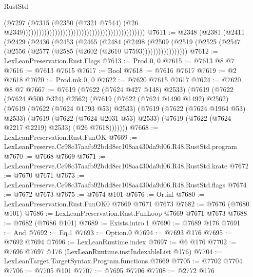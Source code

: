 \begin{lexlean}{RustStd}
\begin{coremodule}
                                                                                        (@7297
                                                                                          (@7315
                                                                                            (@2350
                                                                                              (@7321
                                                                                                @7544)
                                                                                              (@26
                                                                                                @2349))))))))))))))))))))))))))))))))))))))))))))))
@7611 := @2348
    (@2381
      (@2411
        (@2429
          (@2436
            (@2453
              (@2465
                (@2484
                  (@2498
                    (@2509
                      (@2519 (@2525 (@2547 (@2556 (@2577 (@2585 (@2602 (@2610 @7593)))))))))))))))))
@7612 := LexLeanPreservation.Rust.Flags
@7613 := Prod.{0, 0}
@7615 := @7613 @8 @7
@7616 := @7613 @7615
@7617 := Bool
@7618 := @7616 @7617
@7619 := @2 @7618
@7620 := Prod.mk.{0, 0}
@7622 := @7620 @7615 @7617
@7624 := @7620 @8 @7
@7667 := @7619
    (@7622 (@7624 @427 @148) @2533)
    (@7619
      (@7622 (@7624 @500 @324) @2562)
      (@7619
        (@7622 (@7624 @1490 @1492) @2562)
        (@7619
          (@7622 (@7624 @1793 @53) @2533)
          (@7619
            (@7622 (@7624 @1964 @53) @2533)
            (@7619
              (@7622 (@7624 @2031 @53) @2533)
              (@7619 (@7622 (@7624 @2217 @2219) @2533) (@26 @7618)))))))
@7668 := LexLeanPreservation.Rust.FunOK
@7669 := LexLeanPreserve.Cc98c37aafb92bdd8ec108aa430da9d06.R48.RustStd.program
@7670 := @7668 @7669
@7671 := LexLeanPreserve.Cc98c37aafb92bdd8ec108aa430da9d06.R48.RustStd.krate
@7672 := @7670 @7671
@7673 := LexLeanPreserve.Cc98c37aafb92bdd8ec108aa430da9d06.R48.RustStd.flags
@7674 := @7672 @7673
@7675 := @7674 @101
@7676 := Or.inl
@7680 := LexLeanPreservation.Rust.FunOK0 @7669 @7671 @7673
@7682 := @7676 (@7680 @101)
@7686 := LexLeanPreservation.Rust.FunLoop @7669 @7671 @7673
@7688 := @7682 (@7686 @101)
@7689 := Exists.intro.{1}
@7690 := @7689 @176
@7691 := And
@7692 := Eq.{1}
@7693 := Option.{0}
@7694 := @7693 @176
@7695 := @7692 @7694
@7696 := LexLeanRuntime.index
@7697 := @6 @176
@7702 := @7696 @7697 @176 (LexLeanRuntime.instIndexableList @176)
@7704 := LexLeanTarget.TargetSyntax.Program.functions @7669
@7705 := @7702 @7704
@7706 := @7705 @101
@7707 := @7695 @7706
@7708 := @2772 @176

\end{coremodule}
\end{lexlean}
